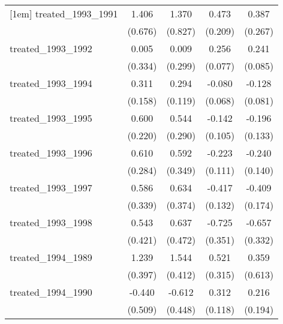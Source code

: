 {\begin{tabular}{l*{4}{c}}
[1em]
treated\_1993\_1991&       1.406\sym{*}  &       1.370         &       0.473\sym{*}  &       0.387         \\
            &     (0.676)         &     (0.827)         &     (0.209)         &     (0.267)         \\
[1em]
treated\_1993\_1992&       0.005         &       0.009         &       0.256\sym{***}&       0.241\sym{**} \\
            &     (0.334)         &     (0.299)         &     (0.077)         &     (0.085)         \\
[1em]
treated\_1993\_1994&       0.311\sym{*}  &       0.294\sym{*}  &      -0.080         &      -0.128         \\
            &     (0.158)         &     (0.119)         &     (0.068)         &     (0.081)         \\
[1em]
treated\_1993\_1995&       0.600\sym{**} &       0.544         &      -0.142         &      -0.196         \\
            &     (0.220)         &     (0.290)         &     (0.105)         &     (0.133)         \\
[1em]
treated\_1993\_1996&       0.610\sym{*}  &       0.592         &      -0.223\sym{*}  &      -0.240         \\
            &     (0.284)         &     (0.349)         &     (0.111)         &     (0.140)         \\
[1em]
treated\_1993\_1997&       0.586         &       0.634         &      -0.417\sym{**} &      -0.409\sym{*}  \\
            &     (0.339)         &     (0.374)         &     (0.132)         &     (0.174)         \\
[1em]
treated\_1993\_1998&       0.543         &       0.637         &      -0.725\sym{*}  &      -0.657\sym{*}  \\
            &     (0.421)         &     (0.472)         &     (0.351)         &     (0.332)         \\
[1em]
treated\_1994\_1989&       1.239\sym{**} &       1.544\sym{***}&       0.521         &       0.359         \\
            &     (0.397)         &     (0.412)         &     (0.315)         &     (0.613)         \\
[1em]
treated\_1994\_1990&      -0.440         &      -0.612         &       0.312\sym{**} &       0.216         \\
            &     (0.509)         &     (0.448)         &     (0.118)         &     (0.194)         \\

\end{tabular}}
